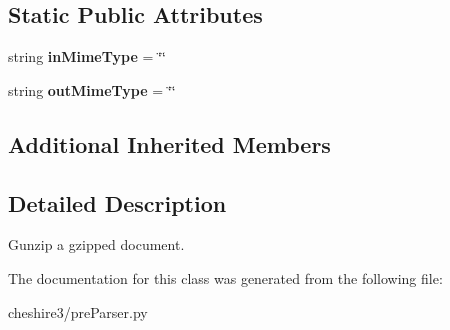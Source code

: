 \subsection*{Static Public Attributes}
\begin{DoxyCompactItemize}
\item 
\hypertarget{classcheshire3_1_1pre_parser_1_1_gunzip_pre_parser_ae01cb73cfd4a99d2ae82cbc89ee246b6}{string {\bfseries in\-Mime\-Type} = \char`\"{}\char`\"{}}\label{classcheshire3_1_1pre_parser_1_1_gunzip_pre_parser_ae01cb73cfd4a99d2ae82cbc89ee246b6}

\item 
\hypertarget{classcheshire3_1_1pre_parser_1_1_gunzip_pre_parser_ac5dfe97d9587378e5ea4e1c61c9b642a}{string {\bfseries out\-Mime\-Type} = \char`\"{}\char`\"{}}\label{classcheshire3_1_1pre_parser_1_1_gunzip_pre_parser_ac5dfe97d9587378e5ea4e1c61c9b642a}

\end{DoxyCompactItemize}
\subsection*{Additional Inherited Members}


\subsection{Detailed Description}
\begin{DoxyVerb}Gunzip a gzipped document.\end{DoxyVerb}
 

The documentation for this class was generated from the following file\-:\begin{DoxyCompactItemize}
\item 
cheshire3/pre\-Parser.\-py\end{DoxyCompactItemize}
